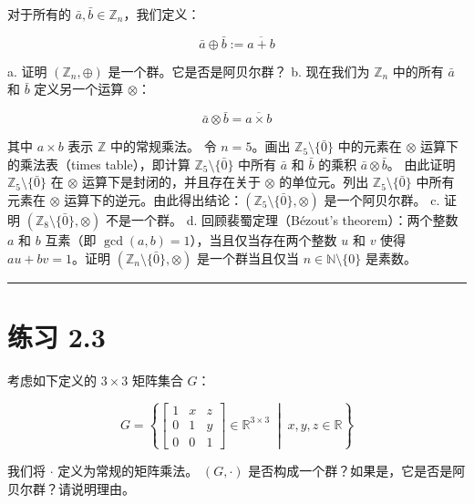 对于所有的 $ \bar{a}, \bar{b} \in \mathbb{Z}_n $，我们定义：

\begin{equation*}
\bar{a} \oplus \bar{b} := \overline{a + b}
\end{equation*}

a. 证明 $ (\mathbb{Z}_n, \oplus) $ 是一个群。它是否是阿贝尔群？ b. 现在我们为 $ \mathbb{Z}_n $ 中的所有 $ \bar{a} $ 和 $ \bar{b} $ 定义另一个运算 $ \otimes $：

\begin{equation}
\bar{a} \otimes \bar{b} = \overline{a \times b}
\tag{2.135}\label{eq:2-135}
\end{equation}

其中 $ a \times b $ 表示 $ \mathbb{Z} $ 中的常规乘法。 令 $ n = 5 $。画出 $ \mathbb{Z}_5 \setminus \{\bar{0}\} $ 中的元素在 $ \otimes $ 运算下的乘法表（times table），即计算 $ \mathbb{Z}_5 \setminus \{\bar{0}\} $ 中所有 $ \bar{a} $ 和 $ \bar{b} $ 的乘积 $ \bar{a} \otimes \bar{b} $。 由此证明 $ \mathbb{Z}_5 \setminus \{\bar{0}\} $ 在 $ \otimes $ 运算下是封闭的，并且存在关于 $ \otimes $ 的单位元。列出 $ \mathbb{Z}_5 \setminus \{\bar{0}\} $ 中所有元素在 $ \otimes $ 运算下的逆元。由此得出结论：$ (\mathbb{Z}_5 \setminus \{\bar{0}\}, \otimes) $ 是一个阿贝尔群。 c. 证明 $ (\mathbb{Z}_8 \setminus \{\bar{0}\}, \otimes) $ 不是一个群。 d. 回顾裴蜀定理（Bézout's theorem）：两个整数 $ a $ 和 $ b $ 互素（即 $ \gcd(a, b) = 1 $），当且仅当存在两个整数 $ u $ 和 $ v $ 使得 $ au + bv = 1 $。证明 $ (\mathbb{Z}_n \setminus \{\bar{0}\}, \otimes) $ 是一个群当且仅当 $ n \in \mathbb{N} \setminus \{0\} $ 是素数。

\medskip\hrule\medskip

\section*{练习 2.3}

考虑如下定义的 $ 3 \times 3 $ 矩阵集合 $ G $：

\begin{equation}
G = \left\{ \begin{bmatrix} 1 & x & z \\ 0 & 1 & y \\ 0 & 0 & 1 \end{bmatrix} \in \mathbb{R}^{3 \times 3} \;\middle|\; x, y, z \in \mathbb{R} \right\}
\tag{2.136}\label{eq:2-136}
\end{equation}

我们将 $ \cdot $ 定义为常规的矩阵乘法。 $ (G, \cdot) $ 是否构成一个群？如果是，它是否是阿贝尔群？请说明理由。

